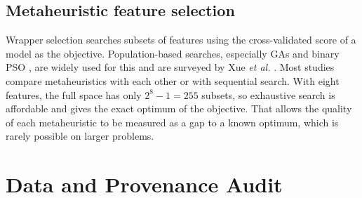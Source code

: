 \documentclass[conference]{IEEEtran}
\begin{document}
\subsection{Metaheuristic feature selection}
Wrapper selection searches subsets of features using the cross-validated score of a model as the objective. Population-based searches, especially GAs \cite{holland1975} and binary PSO \cite{kennedy1997}, are widely used for this and are surveyed by Xue \textit{et al.} \cite{xue2016}. Most studies compare metaheuristics with each other or with sequential search. With eight features, the full space has only $2^8-1=255$ subsets, so exhaustive search is affordable and gives the exact optimum of the objective. That allows the quality of each metaheuristic to be measured as a gap to a known optimum, which is rarely possible on larger problems.

\section{Data and Provenance Audit}
\label{sec:data}
\end{document}
